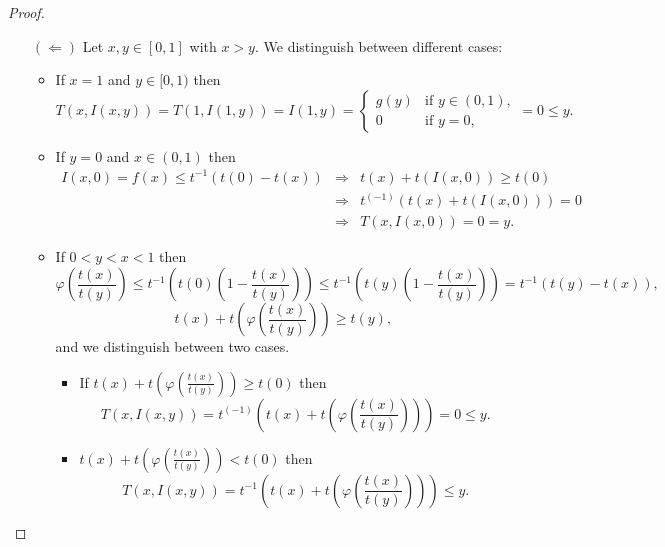 \begin{proof}
\begin{itemize}
		\item[$(\Leftarrow)$] Let $x,y \in [0,1]$ with $x>y$. We distinguish between different cases:
		\begin{itemize}
			\item If $x=1$ and $y \in [0,1)$ then
			$$T(x,I(x,y))=T(1,I(1,y))=I(1,y)=\left\{ \begin{array}{ll}
				g(y) &   \text{if }   y \in (0,1), \\
				0 &  \text{if }   y=0,
			\end{array}
			\right.
			=0 \leq y.$$
			\item If $y=0$ and $x \in (0,1)$ then
			\begin{eqnarray*}
				I(x,0)=f(x) \leq t^{-1}(t(0)-t(x)) & \Rightarrow & t(x)+t(I(x,0)) \geq t(0)\\
				&\Rightarrow& t^{(-1)}(t(x)+t(I(x,0)))=0\\
				&\Rightarrow& T(x,I(x,0))=0=y.
			\end{eqnarray*}
			\item If $0<y<x<1$ then
			$$\varphi \left(\frac{t(x)}{t(y)}\right) \leq t^{-1}\left(t(0)\left(1-\frac{t(x)}{t(y)}\right)\right) \leq t^{-1}\left(t(y)\left(1-\frac{t(x)}{t(y)}\right)\right) = t^{-1}(t(y)-t(x)),$$
			$$t(x) + t \left(\varphi \left(\frac{t(x)}{t(y)}\right)\right) \geq t(y),$$
			and we distinguish between two cases.
			\begin{itemize}
				\item If $t(x) + t \left(\varphi \left(\frac{t(x)}{t(y)}\right)\right) \geq t(0)$ then
				$$T(x,I(x,y))= t^{(-1)}\left(t(x) + t \left(\varphi \left(\frac{t(x)}{t(y)}\right)\right)\right) = 0 \leq y.$$
				\item $t(x) + t \left(\varphi \left(\frac{t(x)}{t(y)}\right)\right) < t(0)$ then 
				$$T(x,I(x,y))=t^{-1}\left(t(x) + t \left(\varphi \left(\frac{t(x)}{t(y)}\right)\right)\right) \leq y.$$
			\end{itemize}
		\end{itemize}
	\end{itemize}
\end{proof}
